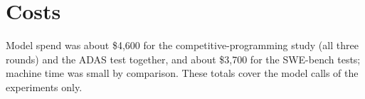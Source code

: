 \section{Costs}\label{app:cost}
Model spend was about \$4{,}600 for the competitive-programming study (all three rounds) and the ADAS test together,
and about \$3{,}700 for the SWE-bench tests; machine time was small by comparison. These totals cover the model calls of the
experiments only.
